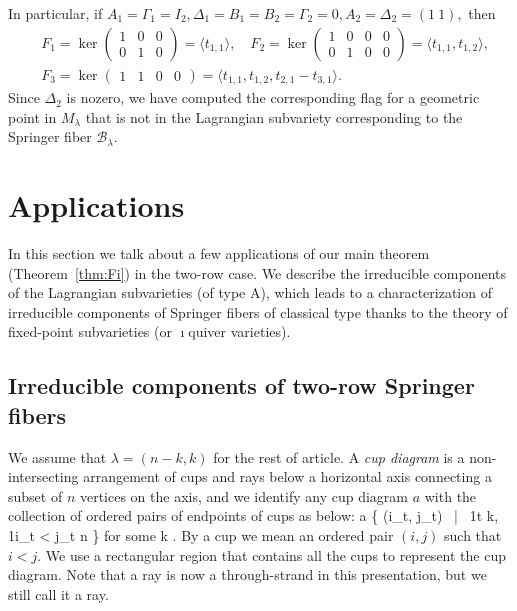 \documentclass[11pt,reqno]{amsart}
\numberwithin{equation}{section}
\theoremstyle{definition}
\def\<{\langle}
\def\>{\rangle}
\newcommand{\cB}{\mathcal{B}}
\newcommand{\ld}{\lambda}
\begin{document}
In particular, if 
$
A_1 = \Gamma_1 = I_2,
\Delta_1 = B_1 = B_2 = \Gamma_2 = 0,
A_2 = \Delta_2 = (1 ~1),
$
then
\[
\begin{split}
&F_1 = \ker \begin{pmatrix} 1& 0 & 0 \\ 0&1&0 \end{pmatrix} = \<t_{1,1}\>,
\quad
F_2 = \ker \begin{pmatrix} 1 & 0 &0& 0 \\ 0&1&0&0 \end{pmatrix} = \<t_{1,1}, t_{1,2}\>,
\\
&
F_3 = \ker \begin{pmatrix} 1 & 1 &0&  0  \end{pmatrix} = \<t_{1,1}, t_{1,2}, t_{2,1}-t_{3,1}\>.
\end{split}
\]
Since $\Delta_2$ is nozero, we have computed the corresponding flag for a geometric point in $M_\ld$ that is not in the Lagrangian subvariety corresponding to the Springer fiber $\cB_\ld$. 
\endex
\section{Applications}\label{sec:appl} 
In this section we talk about a few applications of our main theorem (Theorem~\ref{thm:Fi}) in the two-row case. We describe the irreducible components of the Lagrangian subvarieties (of type A), which leads to a characterization of irreducible components of Springer fibers of classical type thanks to the theory of fixed-point subvarieties (or $\imath$quiver varieties).


\subsection{Irreducible components of two-row Springer fibers}\label{sec:cupdiag}
We assume that $\ld = (n-k,k)$ for the rest of article.
A {\em cup diagram} is a non-intersecting arrangement of cups and rays below a horizontal axis connecting a subset of $n$ vertices on the axis, and we identify any cup diagram $a$ with the collection of ordered pairs of endpoints of cups as below:
\eq\label{eq:cup}
a \equiv \{ (i_t, j_t) ~|~ 1\leq t \leq k, 1\leq i_t < j_t \leq n \} 
\quad
\textup{for some}
\quad
k \leq \left\lfloor{}\right\rfloor.
\endeq
By a cup we mean an ordered pair $(i,j)$ such that $i<j$.
We use a rectangular region that contains all the cups to represent the cup diagram. 
Note that a ray is now a through-strand in this presentation, but we still call it a ray.
\end{document}
